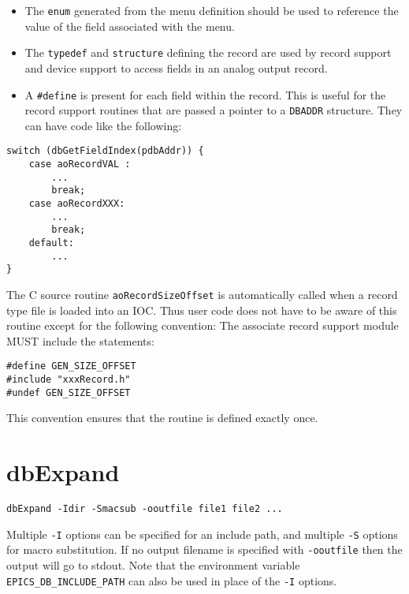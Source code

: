 \begin{itemize}
\item The \verb|enum| generated from the menu definition should be used to reference the value of the field associated with the menu.

\item The \verb|typedef| and \verb|structure| defining the record are used by record support and device support to access fields in an analog output record.

\item A \verb|#define| is present for each field within the record.
This is useful for the record support routines that are passed a pointer to a \verb|DBADDR| structure.
They can have code like the following:

\end{itemize}

\begin{verbatim}
switch (dbGetFieldIndex(pdbAddr)) {
    case aoRecordVAL :
        ...
        break;
    case aoRecordXXX:
        ...
        break;
    default:
        ...
}
\end{verbatim}

The C source routine \verb|aoRecordSizeOffset| is automatically called when a record type file is loaded into an IOC.
Thus user code does not have to be aware of this routine except for the following convention:
The associate record support module MUST include the statements:

\begin{verbatim}
#define GEN_SIZE_OFFSET
#include "xxxRecord.h"
#undef GEN_SIZE_OFFSET
\end{verbatim}

This convention ensures that the routine is defined exactly once.

\section{dbExpand}

\begin{verbatim}
dbExpand -Idir -Smacsub -ooutfile file1 file2 ...
\end{verbatim}

Multiple \verb|-I| options can be specified for an include path, and multiple \verb|-S| options for macro substitution.
If no output filename is specified with \verb|-ooutfile| then the output will go to stdout.
Note that the environment variable \verb|EPICS_DB_INCLUDE_PATH| can also be used in place of the \verb|-I| options.

